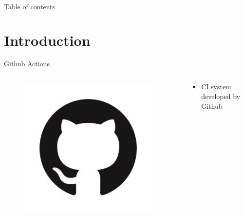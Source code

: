\documentclass[compress,aspectratio=169]{beamer}
\begin{document}
	\begin{frame}[plain]
		\titlepage
	\end{frame}

	\begin{frame}[t]{Table of contents}
		\tableofcontents[subsectionstyle=hide/hide]
	\end{frame}


	\section{Introduction}

	\begin{frame}{Github Actions}
    \begin{columns}
      \begin{column}{0.5\textwidth}
        \begin{figure}
          \begin{center}
            \includegraphics[width=0.95\textwidth]{ghlogo.png}
          \end{center}
        \end{figure}
      \end{column}
      \begin{column}{0.5\textwidth}
        \begin{itemize}
          \item CI system developed by Github

\end{itemize}
\end{column}
\end{columns}
\end{frame}
\end{document}
